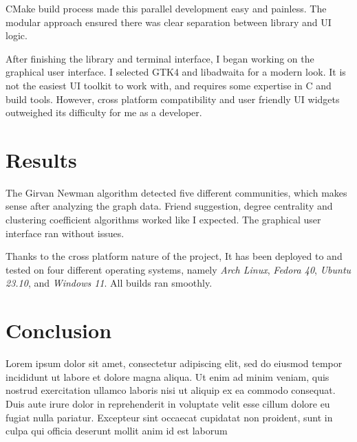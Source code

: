 \documentclass[11pt, twocolumn]{article}
\begin{document}
CMake build process made this parallel development easy and painless. The modular approach ensured there was clear separation 
between library and UI logic. 

After finishing the library and terminal interface, I began working on the graphical user interface. I selected GTK4 and libadwaita
for a modern look. It is not the easiest UI toolkit to work with, and requires some expertise in C and build tools. However, cross
platform compatibility and user friendly UI widgets outweighed its difficulty for me as a developer.

\section{Results}
The Girvan Newman algorithm detected five different communities, which makes sense after analyzing the graph data. Friend suggestion,
degree centrality and clustering coefficient algorithms worked like I expected. The graphical user interface ran without issues.

Thanks to the cross platform nature of the project, It has been deployed to and tested on four different operating systems, 
namely \textit{Arch Linux}, \textit{Fedora 40}, \textit{Ubuntu 23.10}, and \textit{Windows 11}. All builds ran smoothly.


\section{Conclusion}
Lorem ipsum dolor sit amet, consectetur adipiscing elit, sed do eiusmod tempor incididunt ut labore et dolore magna aliqua. Ut enim ad minim veniam, quis nostrud exercitation ullamco laboris nisi ut aliquip ex ea commodo consequat. Duis aute irure dolor in reprehenderit in voluptate velit esse cillum dolore eu fugiat nulla pariatur. Excepteur sint occaecat cupidatat non proident, sunt in culpa qui officia deserunt mollit anim id est laborum

\newpage
\end{document}
